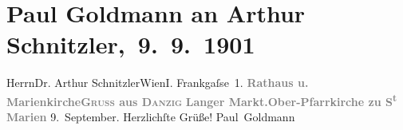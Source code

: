 

         \renewcommand{\erwaehnteOrte}{Orte: Danzig, Frankgasse, Langer Markt, Marienkirche, Rechtstädtisches Rathaus, Wien}
         \renewcommand{\erwaehnteWerke}{}
               \section[ Paul Goldmann an Arthur Schnitzler, 9. 9. 1901]{ Paul Goldmann an Arthur Schnitzler, 9. 9. 1901}\nopagebreak{}\rehead{ }\begin{ledgroupsized}[t]{13cm}\normalsize\beginnumbering \toendnotes[C]{\smallbreak\pagebreak[2]} 
\pstart{}{\pb}Herrn\pend{}\pstart{}Dr. Arthur Schnitzler\pend{}\pstart{}Wien\pend{}\pstart{}I\damage{\textcolor{gray}{X}}. Frankgaſse 1.\pend{}{\bigskip}\pstart
           \noindent{}{\pb}\textcolor{gray}{\textbf{Rathaus u.{ }Marienkirche}}\hfill \textcolor{gray}{\textbf{\textsc{Gruss} aus \textsc{Danzig}}}\pend
           \pstart
           \textcolor{gray}{\textbf{Langer Markt.}}\hfill \textcolor{gray}{\textbf{Ober-Pfarrkirche zu S\textsuperscript{t} Marien}}\pend
           \pstart
           \centering{}9. September.\pend
           \pstart
           Herzlichſte Grüße!\pend
           \pstart \spacefill\mbox{Paul Goldmann}\pend{}
         
         \endnumbering{}\end{ledgroupsized}  \newcommand{\dateiname}{L03083}\newcommand{\titel}{Paul Goldmann an Arthur Schnitzler, 9. 9. 1901}\newcommand{\editorInnen}{Martin Anton Müller und Laura Untner}
      